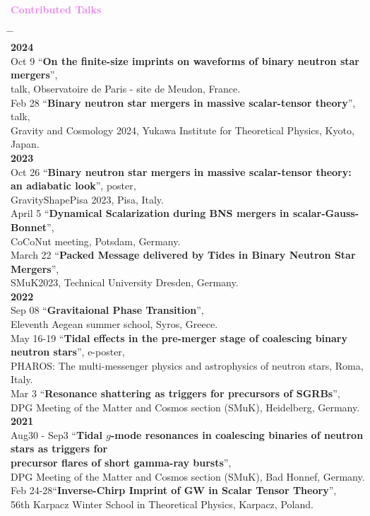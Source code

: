 \documentclass[10pt,floatfix,a4paper]{article}
\begin{document}
{\large \bf \textcolor{Violet}{Contributed Talks}}
\begin{tabbing}
  \hspace*{5mm} \= \hspace*{2cm} \= \hspace*{10cm} \\[-3ex]
  \> {\bf 2024} \> \\[1ex]
  \> Oct 9 \> ``\textbf{On the finite-size imprints on waveforms of binary neutron star mergers}'',\\
  \> \> talk, Observatoire de Paris - site de Meudon, France. \\  
  \> Feb 28 \> ``\textbf{Binary neutron star mergers in massive scalar-tensor theory}'', talk,\\
  \> \> Gravity and Cosmology 2024, Yukawa Institute for Theoretical Physics, Kyoto, Japan.\\
  \> {\bf 2023} \> \\[1ex]
  \> Oct 26 \> ``\textbf{Binary neutron star mergers in massive scalar-tensor theory: an
  adiabatic look}'', poster, \\
  \> \> GravityShapePisa 2023, Pisa, Italy.\\
  \> April 5 \> ``\textbf{Dynamical Scalarization during BNS mergers
  in scalar-Gauss-Bonnet}'', \\
  \> \> CoCoNut meeting, Potsdam, Germany.\\
  \> March 22 \> ``\textbf{Packed Message delivered by Tides in
  Binary Neutron Star Mergers}'', \\
  \> \> SMuK2023, Technical University Dresden, Germany.\\
  \> {\bf 2022} \> \\[1ex]
  \> Sep 08 \> ``\textbf{Gravitaional Phase Transition}'', \\
  \> \> Eleventh Aegean summer school, Syros, Greece.\\
  \> May 16-19 \> ``\textbf{Tidal effects in the pre-merger stage of coalescing binary neutron stars}'', e-poster, \\
  \> \> PHAROS: The multi-messenger physics and astrophysics of neutron stars, Roma, Italy.\\
  \> Mar 3 \> ``\textbf{Resonance shattering as triggers for precursors of SGRBs}'', \\
  \> \> DPG Meeting of the Matter and Cosmos section (SMuK), Heidelberg, Germany.\\
  \> {\bf 2021} \> \\[1ex]
  \> Aug30 - Sep3 \> ``\textbf{Tidal $g$-mode resonances in coalescing binaries of neutron stars as triggers for}\\
  \> \> \textbf{precursor flares of short gamma-ray bursts}'', \\ 
  \> \> DPG Meeting of the Matter and Cosmos section (SMuK), Bad Honnef, Germany. \\
  \> Feb 24-28\>``\textbf{Inverse-Chirp Imprint of GW in Scalar Tensor Theory}'', \\ 
  \> \> 56th Karpacz Winter School in Theoretical Physics, Karpacz, Poland.
\end{tabbing}
\end{document}
